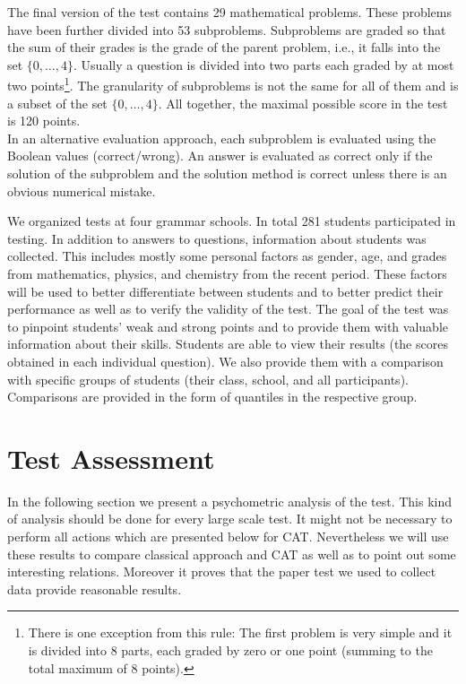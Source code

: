 The final version of the test contains 29 mathematical problems. These problems have been further divided into 53 subproblems. Subproblems are graded so that the sum of their grades is the grade of the parent problem, i.e., it falls into the set $\{0,\ldots,4\}$. Usually a question is divided into two parts each graded by at most two points\footnote{There is one exception from this rule: The first problem is very simple and it is divided into 8 parts, each graded by zero or one point (summing to the total maximum of 8 points).}. The granularity of subproblems is not the same for all of them and is a subset of the set $\{0,\ldots,4\}$. All together, the maximal possible score in the test is 120 points. \\
In an alternative evaluation approach, each subproblem is evaluated using the Boolean values (correct/wrong). An answer is evaluated as correct only if the solution of the subproblem and the solution method is correct unless there is an obvious numerical mistake. 

We organized tests at four grammar schools. In total 281 students participated in testing. In addition to answers to questions, information about students was collected. This includes mostly some personal factors as gender, age, and grades from mathematics, physics, and chemistry from the recent period. These factors will be used to better differentiate between students and to better predict their performance as well as to verify the validity of the test. The goal of the test was to pinpoint students' weak and strong points and to provide them with valuable information about their skills. Students are able to view their results (the scores obtained in each individual question). We also provide them with a comparison with specific groups of students (their class, school, and all participants). Comparisons are provided in the form of quantiles in the respective group.

\section{Test Assessment}
In the following section we present a psychometric analysis of the test. This kind of analysis should be done for every large scale test. It might not be necessary to perform all actions which are presented below for CAT. Nevertheless we will use these results to compare classical approach and CAT as well as to point out some interesting relations. Moreover it proves that the paper test we used to collect data provide reasonable results.

